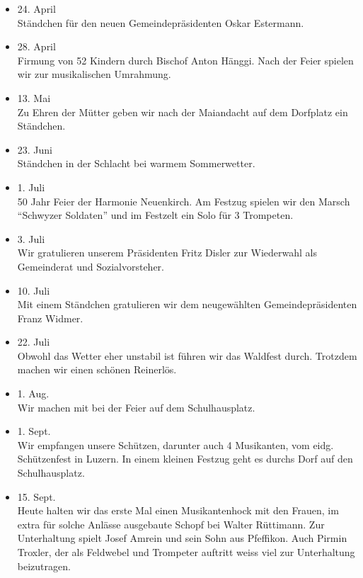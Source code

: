 \begin{multicols}{2}
\begin{itemize}
        \item[]24. April\\
        Ständchen für den neuen Gemeindepräsidenten Oskar Estermann.

        \item[]28. April\\
        Firmung von 52 Kindern durch Bischof Anton Hänggi. Nach der Feier
        spielen wir zur musikalischen Umrahmung.

        \item[]13. Mai\\
        Zu Ehren der Mütter geben wir nach der Maiandacht auf dem Dorfplatz ein
        Ständchen.

        \item[]23. Juni\\
        Ständchen in der Schlacht bei warmem Sommerwetter.

        \item[]1. Juli\\
        50 Jahr Feier der Harmonie Neuenkirch. Am Festzug spielen wir den Marsch
        "`Schwyzer Soldaten"' und im Festzelt ein Solo für 3 Trompeten.

        \item[]3. Juli\\
        Wir gratulieren unserem Präsidenten Fritz Disler zur Wiederwahl als
        Gemeinderat und Sozialvorsteher.

        \item[]10. Juli\\
        Mit einem Ständchen gratulieren wir dem neugewählten Gemeindepräsidenten
        Franz Widmer.

        \item[]22. Juli\\
        Obwohl das Wetter eher unstabil ist führen wir das Waldfest durch.
        Trotzdem machen wir einen schönen Reinerlös.

        \item[]1. Aug.\\
        Wir machen mit bei der Feier auf dem Schulhausplatz.

        \item[]1. Sept.\\
        Wir empfangen unsere Schützen, darunter auch 4 Musikanten, vom eidg.
        Schützenfest in Luzern. In einem kleinen Festzug geht es durchs Dorf auf
        den Schulhausplatz.

        \item[]15. Sept.\\
        Heute halten wir das erste Mal einen Musikantenhock mit den Frauen, im
        extra für solche Anlässe ausgebaute Schopf bei Walter Rüttimann. Zur
        Unterhaltung spielt Josef Amrein und sein Sohn aus Pfeffikon. Auch
        Pirmin Troxler, der als Feldwebel und Trompeter auftritt weiss viel zur
        Unterhaltung beizutragen.


\end{itemize}
\end{multicols}
